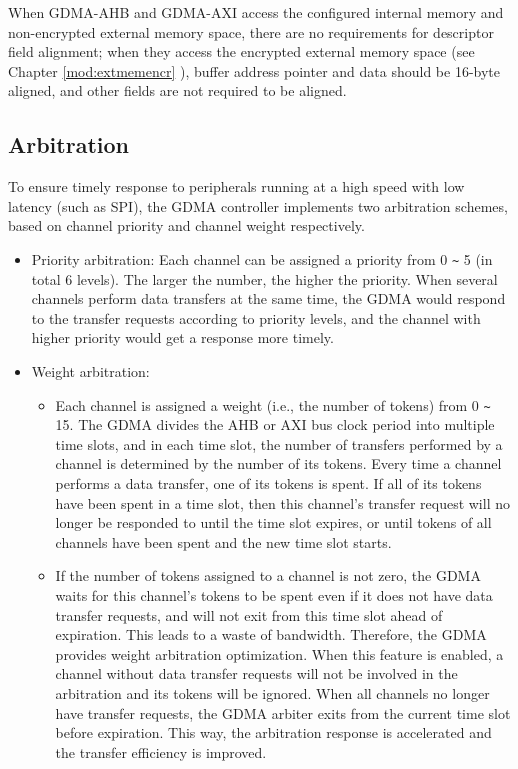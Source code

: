 \documentclass[main\_\_EN.tex]{subfiles}
\begin{document}
When GDMA-AHB and GDMA-AXI access the configured internal memory and non-encrypted external memory space, there are no requirements for descriptor field alignment; when they access the encrypted external memory space (see Chapter \ref{mod:extmemencr} \textit{}), buffer address pointer and data should be 16-byte aligned, and other fields are not required to be aligned.


\subsection{Arbitration}

To ensure timely response to peripherals running at a high speed with low latency (such as SPI), the GDMA controller implements two arbitration schemes, based on channel priority and channel weight respectively.

\begin{itemize}
    \item Priority arbitration: Each channel can be assigned a priority from 0 \verb+~+ 5 (in total 6 levels). The larger the number, the higher the priority. When several channels perform data transfers at the same time, the GDMA would respond to the transfer requests according to priority levels, and the channel with higher priority would get a response more timely.
    \item Weight arbitration:
        \begin{itemize}
            \item Each channel is assigned a weight (i.e., the number of tokens) from 0 \verb+~+ 15. The GDMA divides the AHB or AXI bus clock period into multiple time slots, and in each time slot, the number of transfers performed by a channel is determined by the number of its tokens. Every time a channel performs a data transfer, one of its tokens is spent. If all of its tokens have been spent in a time slot, then this channel's transfer request will no longer be responded to until the time slot expires, or until tokens of all channels have been spent and the new time slot starts.
            \item If the number of tokens assigned to a channel is not zero, the GDMA waits for this channel's tokens to be spent even if it does not have data transfer requests, and will not exit from this time slot ahead of expiration. This leads to a waste of bandwidth. Therefore, the GDMA provides weight arbitration optimization. When this feature is enabled, a channel without data transfer requests will not be involved in the arbitration and its tokens will be ignored. When all channels no longer have transfer requests, the GDMA arbiter exits from the current time slot before expiration. This way, the arbitration response is accelerated and the transfer efficiency is improved.
        \end{itemize}
\end{itemize}
\end{document}
